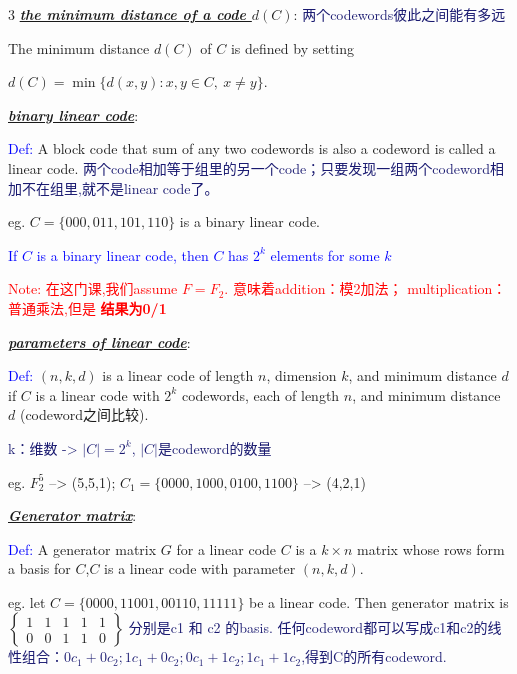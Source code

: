 \documentclass[12pt]{article}
\newcommand{\bulletPoint}[1]{\underline{\textit{\textbf{#1}}}}
\begin{document}
\begin{multicols*}{3}
\bulletPoint{the minimum distance of a code $d(C)$}: 
{\fontsize{5.5pt}{5pt}\selectfont\textcolor{MidnightBlue}{两个codewords彼此之间能有多远}}

The minimum distance $d(C)$ of $C$ is defined by setting

$d(C)=\min\{d(x,y):x,y\in C,\ x\neq y\}.$



\bulletPoint{binary linear code}:

\textcolor{blue}{Def:} A block code that sum of any two codewords is also a codeword is called a linear code.
{\fontsize{5.5pt}{5pt}\selectfont\textcolor{MidnightBlue}{两个code相加等于组里的另一个code；只要发现一组两个codeword相加不在组里,就不是linear code了。}}

eg. ${C=\{000, 011, 101, 110\}}$ is a binary linear code.

\textcolor{blue}{If $C$ is a binary linear code, then $C$ has $2^k$ elements for some $k$}

\textcolor{red}{Note: 在这门课,我们assume $F=F_2$. 意味着addition：模2加法； multiplication：普通乘法,但是
\textbf{结果为0/1}}


\bulletPoint{parameters of linear code}: 

\textcolor{blue}{Def:} $(n,k,d)$ is a linear code of length $n$, dimension $k$, 
and minimum distance $d$ if $C$ is a linear code with $2^k$ codewords, each of length $n$, and minimum distance $d$ (codeword之间比较).

{\fontsize{5.5pt}{5pt}\selectfont\textcolor{MidnightBlue}{k：维数 -> $|C|=2^k$, $|C|$是codeword的数量} }

eg. $F_2^{5}$ --> (5,5,1); $C_1=\{0000,1000,0100,1100\}$ --> (4,2,1)



\bulletPoint{Generator matrix}:

\textcolor{blue}{Def:} A generator matrix $G$ for a linear code $C$ is a $k \times n$ matrix whose
 rows form a basis for $C$,$C$ is a linear code with parameter $(n,k,d)$.

eg. let $C=\{0000, 11001, 00110, 11111\}$ be a linear code. Then generator matrix is $
\begin{Bmatrix}
1&1&1&1&1 \\
0&0&1&1&0 
\end{Bmatrix}
$ 
{\fontsize{5.5pt}{5pt}\selectfont\textcolor{MidnightBlue}{分别是c1 和 c2 的basis. 
任何codeword都可以写成c1和c2的线性组合：$0c_1 + 0c_2; 1c_1 + 0c_2; 0c_1 + 1c_2; 1c_1 + 1c_2$,得到C的所有codeword.}}


\end{multicols*}
\end{document}
